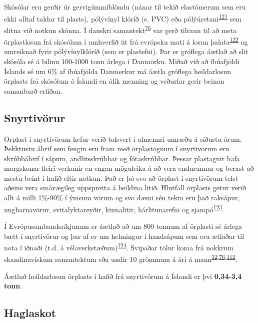 \documentclass[icelandic,]{book}
\begin{document}
Skósólar eru gerðir úr gervigúmmíblöndu (nánar til tekið elastómerum sem eru ekki alltaf taldar til plasts), pólývínyl klóríð (e. PVC) eða pólýúretani\textsuperscript{\protect\hyperlink{ref-karak2009fundamentals}{121}} sem slitna við notkun skónna. Í danskri samantekt\textsuperscript{\protect\hyperlink{ref-lassen2015microplastics}{76}} var gerð tilraun til að meta örplastlosun frá skósólum í umhverfið út frá evrópsku mati á losun þalata\textsuperscript{\protect\hyperlink{ref-Pakalin2008}{122}} og umreiknað fyrir pólývínylklóríð (sem er plastefni). Þar er gróflega áætlað að slit skósóla sé á bilinu 100-1000 tonn árlega í Danmörku. Miðað við að íbúafjöldi Íslands sé um 6\% af íbúafjölda Danmerkur má áætla gróflega heildarlosun örplasts frá skósólum á Íslandi en ólík menning og veðurfar gerir beinan samanburð erfiðan.

\hypertarget{snyrtivorur}{%
\subsection*{Snyrtivörur}\label{snyrtivorur}}

Örplast í snyrtivörum hefur verið talsvert í almennri umræðu á síðustu árum. Þekktustu áhrif sem fengin eru fram með örplastögnum í snyrtivörum eru skrúbbáhrif í sápum, andlitsskrúbbar og fótaskrúbbar. Þessar plastagnir hafa margskonar fleiri verkanir en engan möguleika á að vera endurunnar og berast að mestu beint í hafið eftir notkun. Það er þó svo að örplast í snyrtivörum telst aðeins vera smávægileg uppspretta á heildina litið.
Hlutfall örplasts getur verið allt á milli 1\%-90\% í ýmsum vörum og svo dæmi séu tekin eru það raksápur, ungbarnavörur, svitalyktareyðir, kinnalitir, hárlitunarefni og sjampó\textsuperscript{\protect\hyperlink{ref-Leslie2014}{123}}.

Í Evrópusambandsríkjunum er áætlað að um 800 tonnum af örplasti sé árlega bætt í snyrtivörur og þar af er um helmingur í handsápum sem eru ætlaðar til nota í iðnaði (t.d. á vélaverkstæðum)\textsuperscript{\protect\hyperlink{ref-Scudo2017}{124}}. Svipaðar tölur koma frá nokkrum skandinavískum samantektum eða undir 10 grömmum á ári á mann\textsuperscript{\protect\hyperlink{ref-sundt2014sources}{32},\protect\hyperlink{ref-lassen2015microplastics}{76},\protect\hyperlink{ref-magnusson2016swedish}{112}}.

Áætluð heildarlosun örplasts í hafið frá snyrtivörum á Íslandi er því \textbf{0,34-3,4 tonn}.

\hypertarget{haglaskot}{%
\subsection*{Haglaskot}\label{haglaskot}}
\end{document}
